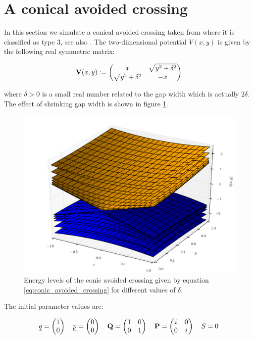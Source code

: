 \FloatBarrier
\section{A conical avoided crossing}

In this section we simulate a conical avoided crossing taken from
\cite{HJ_molecularpropagation} where it is classified as type 3,
see also \cite{H_classification}. The two-dimensional
potential $V(x,y)$ is given by the following real symmetric matrix:

\begin{equation} \label{eq:conic_avoided_crossing}
  \mathbf{V}(x,y) :=
  \begin{pmatrix}
    x                   & \sqrt{y^2+\delta^2} \\
    \sqrt{y^2+\delta^2} & -x
  \end{pmatrix}
\end{equation}

where $\delta > 0$ is a small real number related to the gap width
which is actually $2\delta$. The effect of shrinking gap width is shown
in figure \ref{fig:conic_avoided_crossing_levels}.

\begin{figure}[ht!]
  \centering
  \includegraphics[width=0.7\linewidth]{./fig/conic_shells_0.pdf}
  \caption{Energy levels of the conic avoided crossing given by equation \eqref{eq:conic_avoided_crossing}
          for different values of $\delta$.}
  \label{fig:conic_avoided_crossing_levels}
\end{figure}

The initial parameter values are:

\begin{align*}
  \underline{q} = \begin{pmatrix}
              1 \\ 0
            \end{pmatrix}
  \quad
  \underline{p} = \begin{pmatrix}
              0 \\ 0
            \end{pmatrix}
  \quad
  \mathbf{Q} = \begin{pmatrix}
              1 & 0 \\ 0 & 1
            \end{pmatrix}
  \quad
  \mathbf{P} = \begin{pmatrix}
              i & 0 \\ 0 & i
            \end{pmatrix}
  \quad
  S = 0
\end{align*}

